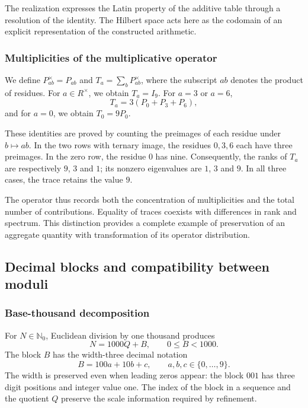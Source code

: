 The realization expresses the Latin property of the additive table through a resolution of the identity. The Hilbert space acts here as the codomain of an explicit representation of the constructed arithmetic.

\subsubsection{Multiplicities of the multiplicative operator}

We define $P^\times_{ab}=P_{ab}$ and $T_a=\sum_bP^\times_{ab}$, where the subscript $ab$ denotes the product of residues. For $a\in R^\times$, we obtain $T_a=I_9$. For $a=3$ or $a=6$,
\begin{equation}
 T_a=3(P_0+P_3+P_6),
\end{equation}
and for $a=0$, we obtain $T_0=9P_0$.

These identities are proved by counting the preimages of each residue under $b\mapsto ab$. In the two rows with ternary image, the residues $0,3,6$ each have three preimages. In the zero row, the residue $0$ has nine. Consequently, the ranks of $T_a$ are respectively $9$, $3$ and $1$; its nonzero eigenvalues are $1$, $3$ and $9$. In all three cases, the trace retains the value $9$.

The operator thus records both the concentration of multiplicities and the total number of contributions. Equality of traces coexists with differences in rank and spectrum. This distinction provides a complete example of preservation of an aggregate quantity with transformation of its operator distribution.

\subsection{Decimal blocks and compatibility between moduli}
\label{sec:app-base-mil}

\subsubsection{Base-thousand decomposition}

For $N\in\mathbb N_0$, Euclidean division by one thousand produces
\begin{equation}
 N=1000Q+B,\qquad 0\leq B<1000.
 \label{eq:app-base1000}
\end{equation}
The block $B$ has the width-three decimal notation
\[
 B=100a+10b+c,\qquad a,b,c\in\{0,\ldots,9\}.
\]
The width is preserved even when leading zeros appear: the block $001$ has three digit positions and integer value one. The index of the block in a sequence and the quotient $Q$ preserve the scale information required by refinement.

